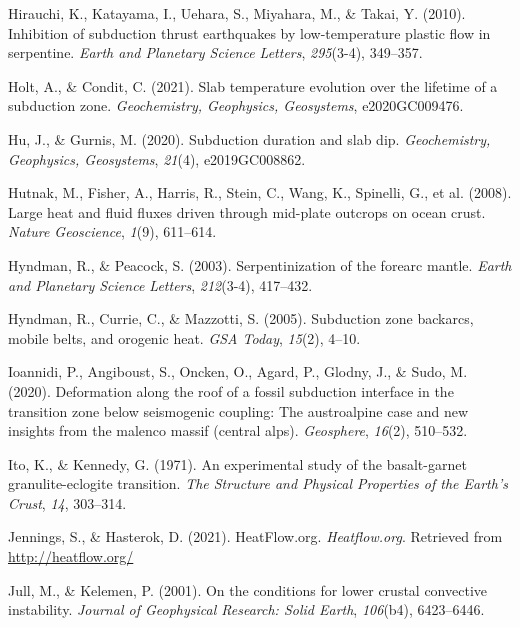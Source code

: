 \begin{CSLReferences}{1}{1}
\leavevmode{}%
Hirauchi, K., Katayama, I., Uehara, S., Miyahara, M., \& Takai, Y. (2010). Inhibition of subduction thrust earthquakes by low-temperature plastic flow in serpentine. \emph{Earth and Planetary Science Letters}, \emph{295}(3-4), 349--357.

\leavevmode{}%
Holt, A., \& Condit, C. (2021). Slab temperature evolution over the lifetime of a subduction zone. \emph{Geochemistry, Geophysics, Geosystems}, e2020GC009476.

\leavevmode{}%
Hu, J., \& Gurnis, M. (2020). Subduction duration and slab dip. \emph{Geochemistry, Geophysics, Geosystems}, \emph{21}(4), e2019GC008862.

\leavevmode{}%
Hutnak, M., Fisher, A., Harris, R., Stein, C., Wang, K., Spinelli, G., et al. (2008). Large heat and fluid fluxes driven through mid-plate outcrops on ocean crust. \emph{Nature Geoscience}, \emph{1}(9), 611--614.

\leavevmode{}%
Hyndman, R., \& Peacock, S. (2003). Serpentinization of the forearc mantle. \emph{Earth and Planetary Science Letters}, \emph{212}(3-4), 417--432.

\leavevmode{}%
Hyndman, R., Currie, C., \& Mazzotti, S. (2005). Subduction zone backarcs, mobile belts, and orogenic heat. \emph{GSA Today}, \emph{15}(2), 4--10.

\leavevmode{}%
Ioannidi, P., Angiboust, S., Oncken, O., Agard, P., Glodny, J., \& Sudo, M. (2020). Deformation along the roof of a fossil subduction interface in the transition zone below seismogenic coupling: The austroalpine case and new insights from the malenco massif (central alps). \emph{Geosphere}, \emph{16}(2), 510--532.

\leavevmode{}%
Ito, K., \& Kennedy, G. (1971). An experimental study of the basalt-garnet granulite-eclogite transition. \emph{The Structure and Physical Properties of the Earth's Crust}, \emph{14}, 303--314.

\leavevmode{}%
Jennings, S., \& Hasterok, D. (2021). HeatFlow.org. \emph{Heatflow.org}. Retrieved from \url{http://heatflow.org/}

\leavevmode{}%
Jull, M., \& Kelemen, P. (2001). On the conditions for lower crustal convective instability. \emph{Journal of Geophysical Research: Solid Earth}, \emph{106}(b4), 6423--6446.


\end{CSLReferences}
